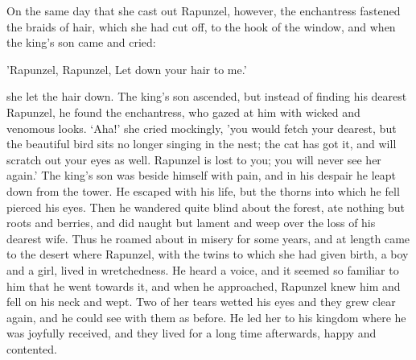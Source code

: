 \documentclass[oneside,11pt]{book} %
\begin{document}
On the same day that she cast out Rapunzel, however, the enchantress fastened the braids of hair, which she had cut off, to the hook of the window, and when the king's son came and cried:

'Rapunzel, Rapunzel,
Let down your hair to me.'

she let the hair down. The king's son ascended, but instead of finding his dearest Rapunzel, he found the enchantress, who gazed at him with wicked and venomous looks. `Aha!' she cried mockingly, 'you would fetch your dearest, but the beautiful bird sits no longer singing in the nest;
the cat has got it, and will scratch out your eyes as well. Rapunzel is lost to you; you will never see her again.' The king's son was beside himself with pain, and in his despair he leapt down from the tower. He escaped with his life, but the thorns into which he fell pierced his eyes. Then he wandered quite blind about the forest, ate nothing but roots and berries, and did naught but lament and weep over the loss of his dearest wife. Thus he roamed about in misery for some years, and at
length came to the desert where Rapunzel, with the twins to which she had given birth, a boy and a girl, lived in wretchedness. He heard a voice, and it seemed so familiar to him that he went towards it, and when he approached, Rapunzel knew him and fell on his neck and wept. Two of her tears wetted his eyes and they grew clear again, and he could see with them as before. He led her to his kingdom where he was joyfully received, and they lived for a long time afterwards, happy and contented.

\end{document}

